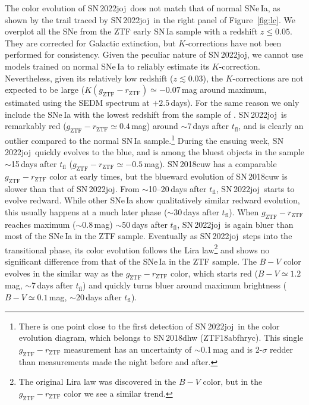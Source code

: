 \documentclass[twocolumn]{aastex631}
\newcommand{\sn}{SN\,2022joj}
\newcommand{\tfl}{$t_\mathrm{fl}$}
\begin{document}
\begin{CJK*}{UTF8}{gbsn}
The color evolution of \sn\ does not match that of normal SNe\,Ia, as shown by the trail traced by \sn\ in the right panel of Figure~\ref{fig:lc}. We overplot all the SNe from the ZTF early SN\,Ia sample \citep{Bulla2020} with a redshift $z\le0.05$. They are corrected for Galactic extinction, but $K$-corrections have not been performed for consistency. Given the peculiar nature of \sn, we cannot use models trained on normal SNe\,Ia to reliably estimate its $K$-correction. Nevertheless, given its relatively low redshift ($z\lesssim0.03$), the $K$-corrections are not expected to be large ($K(g_\mathrm{ZTF}-r_\mathrm{ZTF})\simeq-0.07$\,mag around maximum, estimated using the SEDM spectrum at $+2.5$\,days). For the same reason we only include the SNe\,Ia with the lowest redshift from the sample of \citet{Bulla2020}. 
\sn\ is remarkably red ($g_\mathrm{ZTF} - r_\mathrm{ZTF}\simeq0.4$\,mag) around $\sim$7\,days after $t_\mathrm{fl}$, and is clearly an outlier compared to the normal SN\,Ia sample.\footnote{There is one point close to the first detection of \sn\ in the color evolution diagram, which belongs to SN\,2018dhw (ZTF18abfhryc). This single $g_\mathrm{ZTF}-r_\mathrm{ZTF}$ measurement has an uncertainty of $\sim$0.1\,mag and is 2-$\sigma$ redder than measurements made the night before and after.} 
During the ensuing week, \sn\ quickly evolves to the blue, and is among the bluest objects in the sample $\sim$15\,days after $t_\mathrm{fl}$ ($g_\mathrm{ZTF} - r_\mathrm{ZTF}\simeq -0.5$\,mag). SN\,2018cuw has a comparable $g_\mathrm{ZTF} - r_\mathrm{ZTF}$ color at early times, but the blueward evolution of SN\,2018cuw is slower than that of \sn. 
From $\sim$10--20\,days after \tfl, \sn\ starts to evolve redward. While other SNe\,Ia show qualitatively similar redward evolution, this usually happens at a much later phase ($\sim$30\,days after \tfl). 
When $g_\mathrm{ZTF} - r_\mathrm{ZTF}$ reaches maximum ($\sim$0.8\,mag) $\sim$50\,days after \tfl, \sn\ is again bluer than most of the SNe\,Ia in the ZTF sample. 
Eventually as \sn\ steps into the transitional phase, its color evolution follows the Lira law\footnote{The original Lira law was discovered in the $B-V$ color, but in the $g_\mathrm{ZTF}-r_\mathrm{ZTF}$ color we see a similar trend.} \citep{Lira_1996,Phillips_1999} and shows no significant difference from that of the SNe\,Ia in the ZTF sample.
The $B-V$ color evolves in the similar way as the $g_\mathrm{ZTF}-r_\mathrm{ZTF}$ color, which starts red ($B-V\simeq1.2$\,mag, $\sim$7\,days after \tfl) and quickly turns bluer around maximum brightness ($B-V\simeq0.1$\,mag, $\sim$20\,days after \tfl).


\end{CJK*}
\end{document}
